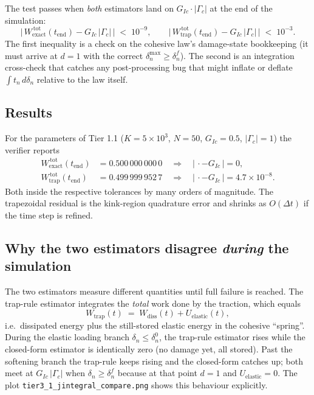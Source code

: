 The test passes when \emph{both} estimators land on $G_{Ic}\cdot|\Gamma_c|$
at the end of the simulation:
\begin{equation}
\bigl|\,W^{\,\text{tot}}_{\!\text{exact}}(t_{\text{end}}) - G_{Ic}\,|\Gamma_c|\,\bigr|
\;<\;10^{-9},
\qquad
\bigl|\,W^{\,\text{tot}}_{\!\text{trap}}(t_{\text{end}})  - G_{Ic}\,|\Gamma_c|\,\bigr|
\;<\;10^{-3}.
\end{equation}
The first inequality is a check on the cohesive law's damage-state
bookkeeping (it must arrive at $d=1$ with the correct
$\delta_n^{\max}\ge\delta_n^{f}$). The second is an integration cross-check
that catches any post-processing bug that might inflate or deflate
$\int t_n\,d\delta_n$ relative to the law itself.

\subsection{Results}

For the parameters of Tier 1.1 ($K=5\times10^{3}$, $N=50$, $G_{Ic}=0.5$,
$|\Gamma_c|=1$) the verifier reports
\begin{align}
W^{\,\text{tot}}_{\!\text{exact}}(t_{\text{end}}) &= 0.500\,000\,000\,0
\quad\Rightarrow\quad
|\,\cdot - G_{Ic}\,| = 0,\\[2pt]
W^{\,\text{tot}}_{\!\text{trap}}(t_{\text{end}})  &= 0.499\,999\,952\,7
\quad\Rightarrow\quad
|\,\cdot - G_{Ic}\,| = 4.7\times 10^{-8}.
\end{align}
Both inside the respective tolerances by many orders of magnitude. The
trapezoidal residual is the kink-region quadrature error and shrinks as
$O(\Delta t)$ if the time step is refined.

\subsection{Why the two estimators disagree \emph{during} the simulation}

The two estimators measure different quantities until full failure is
reached. The trap-rule estimator integrates the \emph{total} work done
by the traction, which equals
\[
W_{\text{trap}}(t) \;=\; W_{\text{diss}}(t) + U_{\text{elastic}}(t),
\]
i.e.\ dissipated energy plus the still-stored elastic energy in the
cohesive ``spring''. During the elastic loading branch
$\delta_n\le\delta_n^{0}$, the trap-rule estimator rises while the
closed-form estimator is identically zero (no damage yet, all stored).
Past the softening branch the trap-rule keeps rising and the closed-form
catches up; both meet at $G_{Ic}\,|\Gamma_c|$ when
$\delta_n\ge\delta_n^{f}$ because at that point $d=1$ and
$U_{\text{elastic}}=0$. The plot
\texttt{tier3\_1\_jintegral\_compare.png} shows this behaviour
explicitly.


